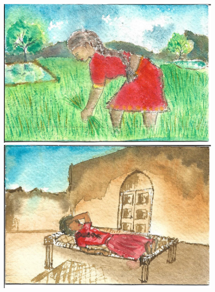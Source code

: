 \documentclass[12pt]{article}
\begin{document}
\newpage

\begin{figure}[h!]
\centering
\includegraphics[width=.331\paperwidth]{pictures/AW}
\hspace*{1cm}\includegraphics[width=.331\paperwidth]{pictures/AR}

\vspace*{1cm}


\end{figure}
\end{document}
